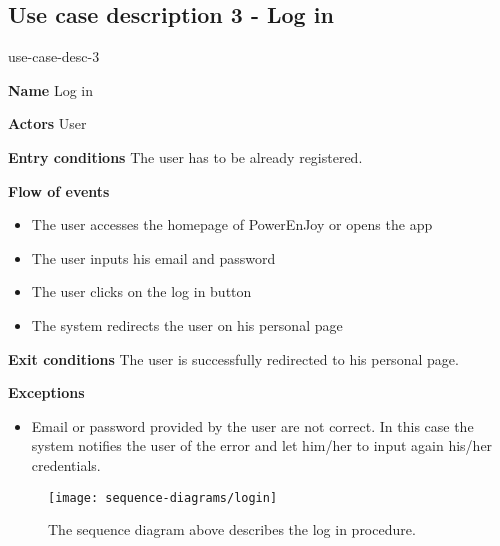 \subsection{Use case description 3 - Log in}
\begin{labeling}{use-case-desc-3}
	\item[\textbf{Name}] Log in
	\item[\textbf{Actors}] User
	\item[\textbf{Entry conditions}] The user has to be already registered.
	\item[\textbf{Flow of events}]
		\begin{itemize}
			\item[]
			\item The user accesses the homepage of PowerEnJoy or opens the app
			\item The user inputs his email and password
			\item The user clicks on the log in button
			\item The system redirects the user on his personal page
		\end{itemize}
	\item[\textbf{Exit conditions}] The user is successfully redirected to his personal page.
	\item[\textbf{Exceptions}]
		\begin{itemize}
			\item[]
			\item Email or password provided by the user are not correct. In this case the system notifies the user of the error and let him/her to input again his/her credentials. 
		\end{itemize}
\end{labeling}
\begin{figure}[H]
	\centering
	\texttt{[image: sequence-diagrams/login]}
	\caption[Sequence diagram - Log in]{The sequence diagram above describes the log in procedure.}
	\label{fig:login-sequence-diagram}
\end{figure}
\clearpage

